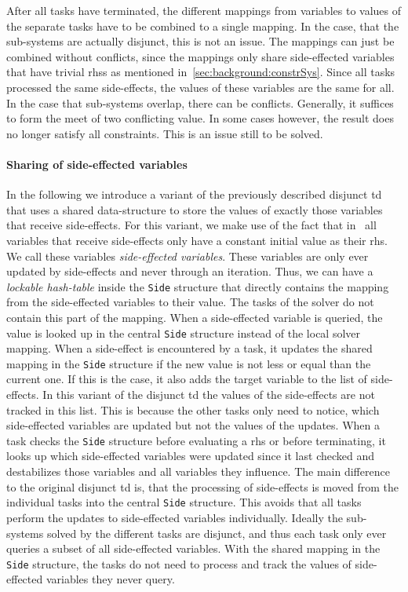     After all tasks have terminated, the different mappings from variables to values of the separate tasks have to be combined to a single mapping. In the case, that the sub-systems are actually disjunct, this is not an issue. The mappings can just be combined without conflicts, since the mappings only share side-effected variables that have trivial \acp{rhs} as mentioned in~\autoref{sec:background:constrSys}. Since all tasks processed the same side-effects, the values of these variables are the same for all.
    In the case that sub-systems overlap, there can be conflicts. Generally, it suffices to form the meet of two conflicting value. In some cases however, the result does no longer satisfy all constraints. This is an issue still to be solved.
    
    \paragraph{Sharing of side-effected variables} In the following we introduce a variant of the previously described disjunct \ac{td} that uses a shared data-structure to store the values of exactly those variables that receive side-effects. For this variant, we make use of the fact that in \gob\ all variables that receive side-effects only have a constant initial value as their \ac{rhs}. We call these variables \textit{side-effected variables}. These variables are only ever updated by side-effects and never through an iteration. Thus, we can have a \textit{lockable hash-table} inside the \texttt{Side} structure that directly contains the mapping from the side-effected variables to their value. The tasks of the solver do not contain this part of the mapping. When a side-effected variable is queried, the value is looked up in the central \texttt{Side} structure instead of the local solver mapping. When a side-effect is encountered by a task, it updates the shared mapping in the \texttt{Side} structure if the new value is not less or equal than the current one. If this is the case, it also adds the target variable to the list of side-effects. In this variant of the disjunct \ac{td} the values of the side-effects are not tracked in this list. This is because the other tasks only need to notice, which side-effected variables are updated but not the values of the updates. When a task checks the \texttt{Side} structure before evaluating a \ac{rhs} or before terminating, it looks up which side-effected variables were updated since it last checked and destabilizes those variables and all variables they influence. The main difference to the original disjunct \ac{td} is, that the processing of side-effects is moved from the individual tasks into the central \texttt{Side} structure. This avoids that all tasks perform the updates to side-effected variables individually. Ideally the sub-systems solved by the different tasks are disjunct, and thus each task only ever queries a subset of all side-effected variables. With the shared mapping in the \texttt{Side} structure, the tasks do not need to process and track the values of side-effected variables they never query.
    